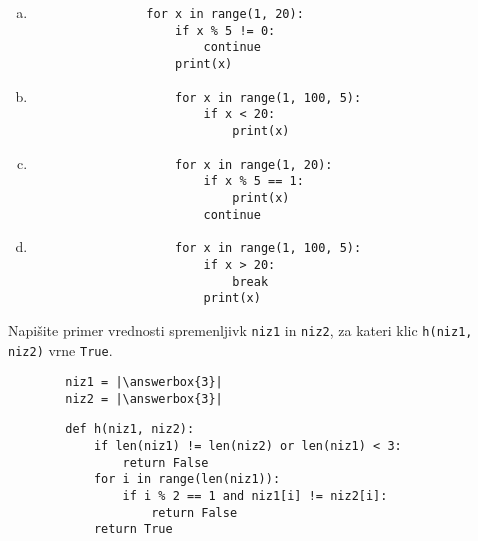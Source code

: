 \documentclass[arhiv, 10pt]{../izpit}
\newcommand{\inlinepy}[1]{\texttt{#1}}
\newcommand{\answerbox}[1]{\framebox{\vphantom{\large M}\hspace{#1cm}}}
\begin{document}
        \begin{multicols}{2}
        \begin{enumerate}[(a)]
\item 
            \begin{verbatim}
                for x in range(1, 20):
                    if x % 5 != 0:
                        continue
                    print(x)
            \end{verbatim}
        
\item 
                \begin{verbatim}
                    for x in range(1, 100, 5):
                        if x < 20:
                            print(x)
                \end{verbatim}
            
\item 
                \begin{verbatim}
                    for x in range(1, 20):
                        if x % 5 == 1:
                            print(x)
                        continue
                \end{verbatim}
            
\item 
                \begin{verbatim}
                    for x in range(1, 100, 5):
                        if x > 20:
                            break
                        print(x)
                \end{verbatim}
            
\end{enumerate}

        \end{multicols}
    
        \naloga*
        \begin{multicols}{2}
        \noindent
        Napišite primer vrednosti spremenljivk \inlinepy{niz1} in \inlinepy{niz2}, za kateri klic \inlinepy{h(niz1, niz2)} vrne \inlinepy{True}.
        \begin{verbatim}
        niz1 = |\answerbox{3}|
        niz2 = |\answerbox{3}|
        \end{verbatim}
        \vfil
        \columnbreak
        \begin{verbatim}
        def h(niz1, niz2):
            if len(niz1) != len(niz2) or len(niz1) < 3:
                return False
            for i in range(len(niz1)):
                if i % 2 == 1 and niz1[i] != niz2[i]:
                    return False
            return True
        \end{verbatim}
        \end{multicols}
    
\end{document}
